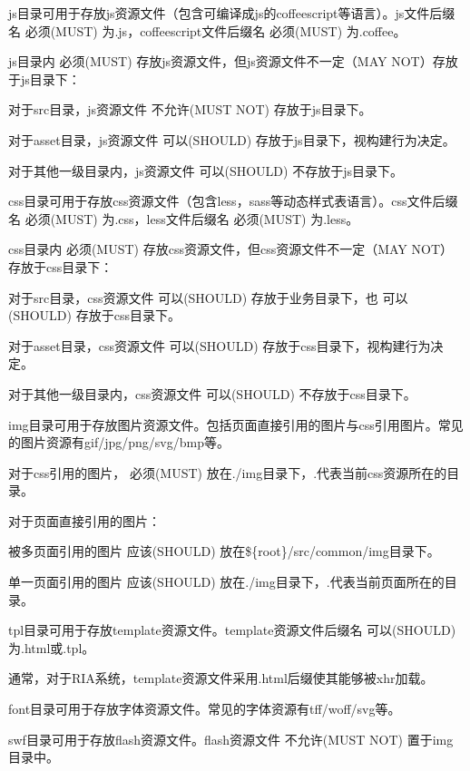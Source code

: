 \begin{compactitem}
\item js目录可用于存放js资源文件（包含可编译成js的coffeescript等语言）。js文件后缀名 必须(MUST) 为.js，coffeescript文件后缀名 必须(MUST) 为.coffee。

js目录内 必须(MUST) 存放js资源文件，但js资源文件不一定（MAY NOT）存放于js目录下：

\begin{compactenum}
\item 对于src目录，js资源文件 不允许(MUST NOT) 存放于js目录下。
\item 对于asset目录，js资源文件 可以(SHOULD) 存放于js目录下，视构建行为决定。
\item 对于其他一级目录内，js资源文件 可以(SHOULD) 不存放于js目录下。
\end{compactenum}

\item css目录可用于存放css资源文件（包含less，sass等动态样式表语言）。css文件后缀名 必须(MUST) 为.css，less文件后缀名 必须(MUST) 为.less。

css目录内 必须(MUST) 存放css资源文件，但css资源文件不一定（MAY NOT）存放于css目录下：

\begin{compactenum}
\item 对于src目录，css资源文件 可以(SHOULD) 存放于业务目录下，也 可以(SHOULD) 存放于css目录下。
\item 对于asset目录，css资源文件 可以(SHOULD) 存放于css目录下，视构建行为决定。
\item 对于其他一级目录内，css资源文件 可以(SHOULD) 不存放于css目录下。
\end{compactenum}

\item img目录可用于存放图片资源文件。包括页面直接引用的图片与css引用图片。常见的图片资源有gif/jpg/png/svg/bmp等。

对于css引用的图片， 必须(MUST) 放在./img目录下，.代表当前css资源所在的目录。

对于页面直接引用的图片：



\begin{compactenum}
\item 被多页面引用的图片 应该(SHOULD) 放在\$\{root\}/src/common/img目录下。
\item 单一页面引用的图片 应该(SHOULD) 放在./img目录下，.代表当前页面所在的目录。
\end{compactenum}

\item tpl目录可用于存放template资源文件。template资源文件后缀名 可以(SHOULD) 为.html或.tpl。

通常，对于RIA系统，template资源文件采用.html后缀使其能够被xhr加载。

\item font目录可用于存放字体资源文件。常见的字体资源有tff/woff/svg等。


\item swf目录可用于存放flash资源文件。flash资源文件 不允许(MUST NOT) 置于img目录中。

\end{compactitem}




